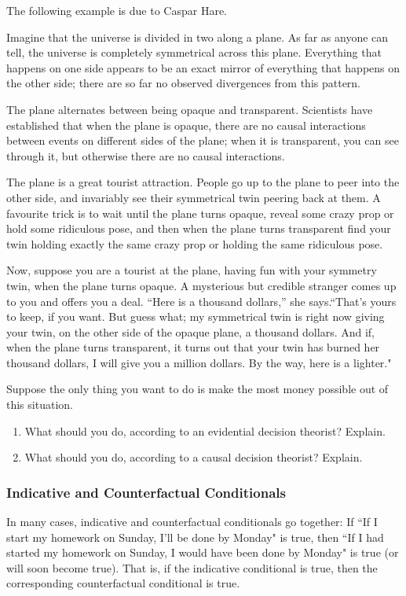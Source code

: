 \documentclass[12pt,a4paper]{article}
\begin{document}
The following example is due to Caspar Hare.

Imagine that the universe is divided in two along a plane. As far as anyone can tell, the universe is completely symmetrical across this plane. Everything that happens on one side appears to be an exact mirror of everything that happens on the other side; there are so far no observed divergences from this pattern.

The plane alternates between being opaque and transparent. Scientists have established that when the plane is opaque, there are no causal interactions between events on different sides of the plane; when it is transparent, you can see through it, but otherwise there are no causal interactions.

The plane is a great tourist attraction. People go up to the plane to peer into the other side, and invariably see their symmetrical twin peering back at them. A favourite trick is to wait until the plane turns opaque, reveal some crazy prop or hold some ridiculous pose, and then when the plane turns transparent find your twin holding exactly the same crazy prop or holding the same ridiculous pose.

Now, suppose you are a tourist at the plane, having fun with your symmetry twin, when the plane turns opaque. A mysterious but credible stranger comes up to you and offers you a deal. ``Here is a thousand dollars,'' she says.``That's yours to keep, if you want. But guess what; my symmetrical twin is right now giving your twin, on the other side of the opaque plane, a thousand dollars. And if, when the plane turns transparent, it turns out that your twin has burned her thousand dollars, I will give you a million dollars. By the way, here is a lighter."

Suppose the only thing you want to do is make the most money possible out of this situation.

\begin{enumerate}
\item What should you do, according to an evidential decision theorist? Explain.
\item What should you do, according to a causal decision theorist? Explain.
\end{enumerate}

\subsubsection*{Indicative and Counterfactual Conditionals}
In many cases, indicative and counterfactual conditionals go together: If ``If I start my homework on Sunday, I'll be done by Monday" is true, then ``If I had started my homework on Sunday, I would have been done by Monday" is true (or will soon become true). That is, if the indicative conditional is true, then the corresponding counterfactual conditional is true.
\end{document}
